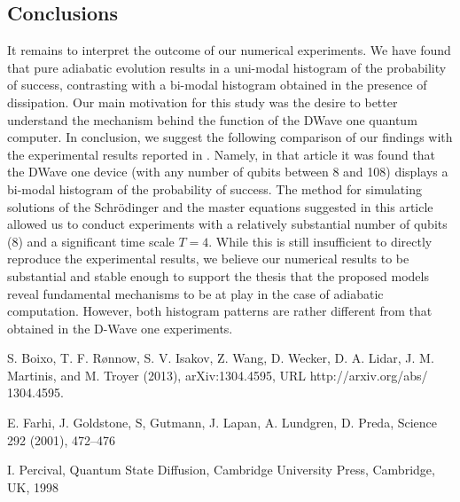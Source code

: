 \documentclass[11 pt]{article}
\begin{document}
\subsection{Conclusions}

It remains to interpret the outcome of our numerical experiments.  We have found that pure adiabatic evolution results in a uni-modal histogram of the probability of success, contrasting with a bi-modal histogram obtained in the presence of dissipation. Our main motivation for this study was the desire to better understand the mechanism behind the function of the DWave one quantum computer. In conclusion, we suggest the following comparison of our findings with the experimental results reported in \cite{Boxio}. Namely, in that article it was found that the DWave one device (with any number of qubits between 8 and 108) displays a bi-modal histogram of the probability of success.  The method for simulating solutions of the Schr\"{o}dinger and the master equations suggested in this article allowed us to conduct experiments with a relatively substantial number of qubits (8) and a significant time scale $T=4$. While this is still insufficient to directly reproduce the experimental results, we believe our numerical results to be substantial and stable enough to support the thesis that the proposed models reveal fundamental mechanisms to be at play in the case of adiabatic computation. However, both histogram patterns are rather different from that obtained in the D-Wave one experiments.


\begin{thebibliography}{[90]}

 S. Boixo, T. F. R{\o}nnow, S. V. Isakov, Z. Wang,
D. Wecker, D. A. Lidar, J. M. Martinis, and M. Troyer
(2013), arXiv:1304.4595, URL http://arxiv.org/abs/
1304.4595.

 E. Farhi, J. Goldstone, S, Gutmann, J. Lapan, A. Lundgren, D. Preda, {\sc Science} 292 (2001), 472--476



 I. Percival, Quantum State Diffusion, Cambridge University Press, Cambridge, UK, 1998


\end{thebibliography}
\newpage
\end{document}

